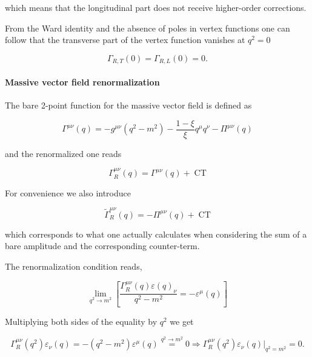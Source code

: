 \documentclass[../FeynCalcManual.tex]{subfiles}
\begin{document}
which means that the longitudinal part does not receive higher-order
corrections.

From the Ward identity and the absence of poles in vertex functions one
can follow that the transverse part of the vertex function vanishes at
\(q^2=0\)

\begin{equation}
    \Gamma_{R,T} (0) = \Gamma_{R,L} (0) = 0.
\end{equation}

\hypertarget{massive-vector-field-renormalization}{%
\paragraph{Massive vector field
renormalization}\label{massive-vector-field-renormalization}}

The bare 2-point function for the massive vector field is defined as

\begin{equation}
    \Gamma^{\mu \nu} (q) = -g^{\mu \nu} (q^2 - m^2) - \frac{1-\xi}{\xi} q^{\mu} q^{\nu}  - \Pi^{\mu \nu} (q)
\end{equation}

and the renormalized one reads

\begin{equation}
    \Gamma_R^{\mu \nu} (q) = \Gamma^{\mu \nu} (q) + \;\text{CT}
\end{equation}

For convenience we also introduce

\begin{equation}
    \tilde{\Gamma}^{\mu \nu}_R(q) = - \Pi^{\mu \nu} (q) + \;\text{CT}
\end{equation}

which corresponds to what one actually calculates when considering the
sum of a bare amplitude and the corresponding counter-term.

The renormalization condition reads,

\begin{equation}
    \lim_{q^2 \to m^2} \left [ \frac{\Gamma_R^{\mu \nu} (q) \varepsilon(q)_\nu}{q^2 - m^2}  = - \varepsilon^{\mu}(q) \right ]
\end{equation}

Multiplying both sides of the equality by \(q^2\) we get

\begin{equation}
    \Gamma_R^{\mu \nu} (q^2)   \varepsilon_\nu (q) = - (q^2 - m^2) \varepsilon^{\mu}(q) \overset{q^2 \to m^2}{=} 0 \Rightarrow \Gamma_R^{\mu \nu} (q^2) \varepsilon_\nu(q) \biggl|_{q^2=m^2}  = 0.
\end{equation}
\end{document}
